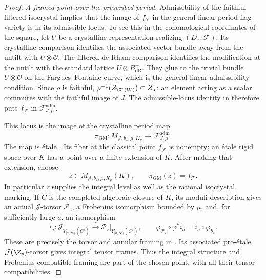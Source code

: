 \begin{proof}
\medskip\noindent
\emph{A framed point over the prescribed period.}
Admissibility of the faithful filtered isocrystal implies that
the image of $f_{\mathcal F}$ in the general linear period flag
variety is in its admissible locus.  To see this in the
cohomological coordinates of the square, let $U$ be a crystalline
representation realizing $(D_x,\mathcal F)$.  Its crystalline
comparison identifies the associated vector bundle away from
the untilt with $U\otimes\mathcal O$.  The filtered de Rham
comparison identifies the modification at the untilt with the
standard lattice $U\otimes B_{\mathrm{dR}}^+$.  They glue to the
trivial bundle $U\otimes\mathcal O$ on the Fargues--Fontaine
curve, which is the general linear admissibility condition.
Since $\rho$ is faithful,
$\rho^{-1}(Z_{\GL(W)})\subset Z_J$: an element acting as a scalar
commutes with the faithful image of $J$.  The admissible-locus
identity in \cite[Proposition~3.1.1(i), (3.1.9)]{PappasRapoport2024}
therefore puts $f_{\mathcal F}$ in
$\mathcal F_{J,\mu}^{\mathrm{adm}}$.

This locus is the image of the crystalline period map
\[
 \pi_{\mathrm{GM}}:
 M_{\mathcal J,b_x,\mu,K_p}
       \longrightarrow\mathcal F_{J,\mu}^{\mathrm{adm}}.
\]
The map is \'{e}tale
\cite[\S3.1.1, (3.1.4)]{PappasRapoport2024}.
Its fiber at the classical point $f_{\mathcal F}$ is nonempty;
an \'{e}tale rigid space over $K$ has a point over a finite
extension of $K$.  After making that extension, choose
\begin{equation}
 z\in M_{\mathcal J,b_x,\mu,K_p}(K),
 \qquad \pi_{\mathrm{GM}}(z)=f_{\mathcal F}.
 \label{eq:transport-framed-point}
\end{equation}
In particular $z$ supplies the integral level as well as the
rational isocrystal marking.  If $C$ is the completed algebraic
closure of $K$, its moduli description gives an actual
$\mathcal J$-torsor $\mathcal P_z$, a Frobenius isomorphism
bounded by $\mu$, and, for sufficiently large $a$, an isomorphism
\[
 i_a:\mathcal J_{Y_{[a,\infty)}(C^\flat)}
      \xrightarrow{\ \sim\ }
      \mathcal P_z|_{Y_{[a,\infty)}(C^\flat)},
 \qquad
 \varphi_{\mathcal P_z}\circ\varphi^*i_a
       =i_a\circ\varphi_{b_x}.
\]
These are precisely the torsor and annular framing in
\cite[\S3.1.1]{PappasRapoport2024}.  Its associated
pro-\'{e}tale $\mathcal J(\Z_p)$-torsor gives integral tensor
frames.  Thus the integral structure and Frobenius-compatible
framing are part of the chosen point, with all their tensor
compatibilities.


\end{proof}
